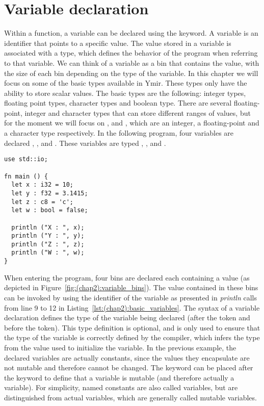 \section{Variable declaration}

Within a function, a variable can be declared using the  keyword. A
variable is an identifier that points to a specific value. The value stored in a
variable is associated with a type, which defines the behavior of the program
when referring to that variable. We can think of a variable as a bin that
contains the value, with the size of each bin depending on the type of the
variable. In this chapter we will focus on some of the basic types available in
Ymir. These types only have the ability to store scalar values. The basic types
are the following: integer types, floating point types, character types and
boolean type. There are several floating-point, integer and character types that
can store different ranges of values, but for the moment we will focus on
,  and , which are an integer, a floating-point
and a character type respectively. In the following program, four variables are
declared , ,  and . These variables are
typed , ,  and .

\begin{lstlisting}[style=coloredVerbatim, caption=simple variable declaration, label=lst:(chap2):basic_variables]
use std::io;

fn main () {
  let x : i32 = 10;
  let y : f32 = 3.1415;
  let z : c8 = 'c';
  let w : bool = false;

  println ("X : ", x);
  println ("Y : ", y);
  println ("Z : ", z);
  println ("W : ", w);
}
\end{lstlisting}



When entering the program, four bins are declared each containing a value (as
depicted in Figure~\ref{fig:(chap2):variable_bins}). The value contained in
these bins can be invoked by using the identifier of the variable as presented
in \textit{println} calls from line 9 to 12 in
Listing~\ref{lst:(chap2):basic_variables}. The syntax of a variable declaration
defines the type of the variable being declared (after the \token{:} token and
before the \token{=} token). This type definition is optional, and is only used
to ensure that the type of the variable is correctly defined by the compiler,
which infers the type from the value used to initialize the variable. In the
previous example, the declared variables are actually constants, since the
values they encapsulate are not mutable and therefore cannot be changed. The
keyword  can be placed after the keyword  to define that a
variable is mutable (and therefore actually a variable). For simplicity, named
constants are also called variables, but are distinguished from actual
variables, which are generally called mutable variables.


